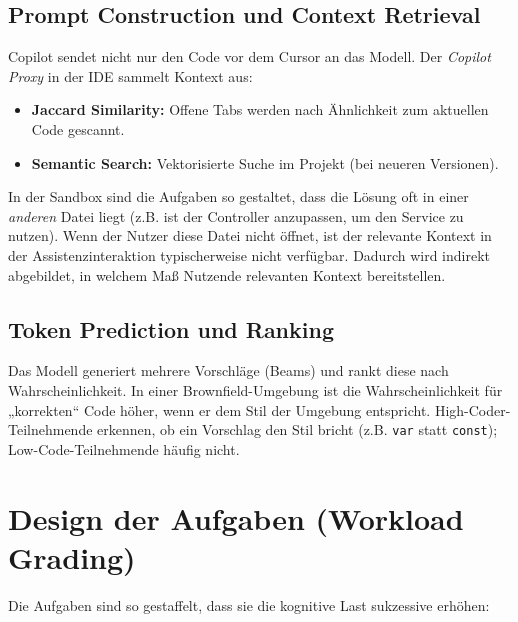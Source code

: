 \subsection{Prompt Construction und Context Retrieval}
Copilot sendet nicht nur den Code vor dem Cursor an das Modell. Der \emph{Copilot Proxy} in der IDE sammelt Kontext aus:
\begin{itemize}
    \item  \textbf{Jaccard Similarity:} Offene Tabs werden nach Ähnlichkeit zum aktuellen Code gescannt.
    \item  \textbf{Semantic Search:} Vektorisierte Suche im Projekt (bei neueren Versionen).
\end{itemize}
\begin{sloppypar}
In der Sandbox sind die Aufgaben so gestaltet, dass die Lösung oft in einer \emph{anderen} Datei liegt (z.B. ist der Controller anzupassen, um den Service zu nutzen). Wenn der Nutzer diese Datei nicht öffnet, ist der relevante Kontext in der Assistenzinteraktion typischerweise nicht verfügbar. Dadurch wird indirekt abgebildet, in welchem Maß Nutzende relevanten Kontext bereitstellen.
\end{sloppypar}

\subsection{Token Prediction und Ranking}
Das Modell generiert mehrere Vorschläge (Beams) und rankt diese nach Wahrscheinlichkeit. In einer Brownfield-Umgebung ist die Wahrscheinlichkeit für „korrekten“ Code höher, wenn er dem Stil der Umgebung entspricht. High-Coder-Teilnehmende erkennen, ob ein Vorschlag den Stil bricht (z.B. \texttt{var} statt \texttt{const}); Low-Code-Teilnehmende häufig nicht.

\section{Design der Aufgaben (Workload Grading)}

Die Aufgaben sind so gestaffelt, dass sie die kognitive Last sukzessive erhöhen:

